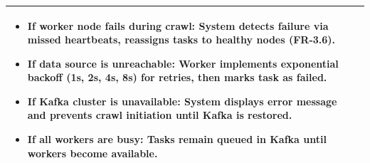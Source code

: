 \begin{minipage}{\textwidth}
\begin{tabularx}{\textwidth}{|p{}|X|}
{        \setlist[itemize]{nosep, leftmargin=1em, itemsep=0pt, parsep=0pt, topsep=0pt, partopsep=0pt, after=\strut}
        \begin{itemize}
            \item If worker node fails during crawl: System detects failure via missed heartbeats, reassigns tasks to healthy nodes (FR-3.6).
            \item If data source is unreachable: Worker implements exponential backoff (1s, 2s, 4s, 8s) for retries, then marks task as failed.
            \item If Kafka cluster is unavailable: System displays error message and prevents crawl initiation until Kafka is restored.
            \item If all workers are busy: Tasks remain queued in Kafka until workers become available.
        \end{itemize}%
        } \\
    \hline
\end{tabularx}
\end{minipage}
\bigskip

